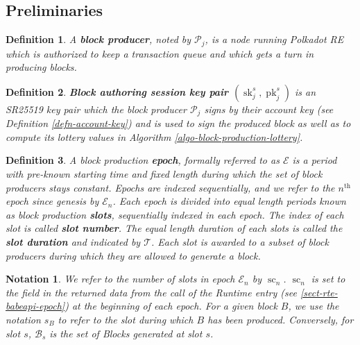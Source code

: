 \documentclass{book}
\newcommand{\tmop}[1]{\ensuremath{\operatorname{#1}}}
\newcommand{\tmstrong}[1]{\textbf{#1}}
\newcommand{\tmtextbf}[1]{{\bfseries{#1}}}
\newcommand{\tmtexttt}[1]{{\ttfamily{#1}}}
\newcommand{\tmverbatim}[1]{{\ttfamily{#1}}}
\newtheorem{definition}{Definition}
\newtheorem{notation}{Notation}
\providecommand{\tmop}[1]{\ensuremath{\mathrm{#1}}}
\providecommand{\tmstrong}[1]{\tmtextbf{#1}}
\providecommand{\tmtextbf}[1]{\tmtextbf{#1}}
\providecommand{\tmverbatim}[1]{\tmtexttt{#1}}
\newtheorem{definition}{Definition}
\newtheorem{notation}{Notation}
\begin{document}
\subsection{Preliminaries}

\begin{definition}
  A {\tmstrong{block producer}}, noted by $\mathcal{P}_j$, is a node running
  Polkadot RE which is authorized to keep a transaction queue and which gets a
  turn in producing blocks.
\end{definition}

\begin{definition}
  {\tmstrong{Block authoring session key pair $(\tmop{sk}^s_j,
  \tmop{pk}^s_j)$}} is an SR25519 key pair which the block producer
  $\mathcal{P}_j$ signs by their account key (see Definition
  \ref{defn-account-key}) and is used to sign the produced block as well as to
  compute its lottery values in Algorithm \ref{algo-block-production-lottery}.
  
\end{definition}

\begin{definition}
  \label{defn-epoch-slot}A block production {\tmstrong{epoch}}, formally
  referred to as $\mathcal{E}$ is a period with pre-known starting time and
  fixed length during which the set of block producers stays constant. Epochs
  are indexed sequentially, and we refer to the $n^{\tmop{th}}$ epoch since
  genesis by $\mathcal{E}_n$. Each epoch is divided into equal length periods
  known as block production {\tmstrong{slots}}, sequentially indexed in each
  epoch. The index of each slot is called {\tmstrong{slot number}}. The equal
  length duration of each slots is called the {\tmstrong{slot duration}} and
  indicated by $\mathcal{T}$. Each slot is awarded to a subset of block
  producers during which they are allowed to generate a block.
\end{definition}

\begin{notation}
  \label{note-slot}We refer to the number of slots in epoch $\mathcal{E}_n$ by
  $\tmop{sc}_n$. $\tmop{sc}_n$ is set to the \tmverbatim{duration} field in
  the returned data from the call of the Runtime entry
  \tmverbatim{BabeApi\_epoch} (see \ref{sect-rte-babeapi-epoch}) at the
  beginning of each epoch. For a given block $B$, we use the notation
  {\tmstrong{$s_B$}} to refer to the slot during which $B$ has been produced.
  Conversely, for slot $s$, $\mathcal{B}_s$ is the set of Blocks generated at
  slot $s$.
\end{notation}
\end{document}
